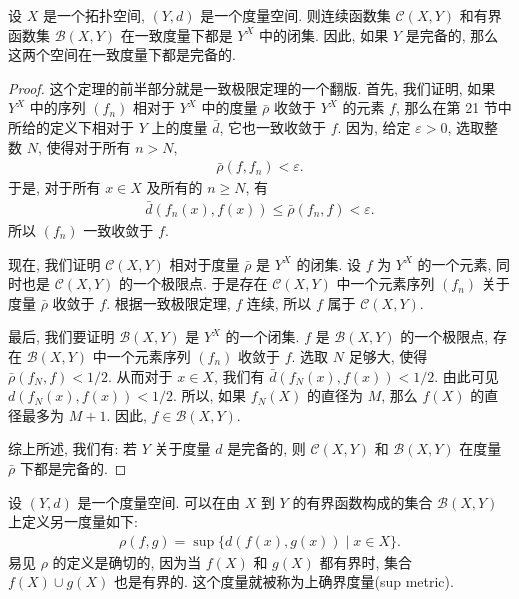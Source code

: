 \documentclass[../../main.tex]{subfiles}
\begin{document}
\begin{theorem}\label{theorem:ch07-C-B-closed}
设 $X$ 是一个拓扑空间, $(Y,d)$ 是一个度量空间. 则连续函数集 $\mathcal{C}(X,Y)$ 和有界函数集 $\mathcal{B}(X,Y)$ 在一致度量下都是 $Y^X$ 中的闭集. 因此, 如果 $Y$ 是完备的, 那么这两个空间在一致度量下都是完备的.
\end{theorem}

\begin{proof}
这个定理的前半部分就是一致极限定理的一个翻版. 首先, 我们证明, 如果 $Y^X$ 中的序列 $(f_n)$ 相对于 $Y^X$ 中的度量 $\bar{\rho}$ 收敛于 $Y^X$ 的元素 $f$, 那么在第 21 节中所给的定义下相对于 $Y$ 上的度量 $\bar{d}$, 它也一致收敛于 $f$. 因为, 给定 $\varepsilon>0$, 选取整数 $N$, 使得对于所有 $n>N$,
\begin{align*}
\bar{\rho}(f,f_n)<\varepsilon.
\end{align*}
于是, 对于所有 $x\in X$ 及所有的 $n\geqslant N$, 有
\begin{align*}
\bar{d}(f_n(x),f(x))\leqslant\bar{\rho}(f_n,f)<\varepsilon.
\end{align*}
所以 $(f_n)$ 一致收敛于 $f$.

现在, 我们证明 $\mathcal{C}(X,Y)$ 相对于度量 $\bar{\rho}$ 是 $Y^X$ 的闭集. 设 $f$ 为 $Y^X$ 的一个元素, 同时也是 $\mathcal{C}(X,Y)$ 的一个极限点. 于是存在 $\mathcal{C}(X,Y)$ 中一个元素序列 $(f_n)$ 关于度量 $\bar{\rho}$ 收敛于 $f$. 根据一致极限定理, $f$ 连续, 所以 $f$ 属于 $\mathcal{C}(X,Y)$.

最后, 我们要证明 $\mathcal{B}(X,Y)$ 是 $Y^X$ 的一个闭集. $f$ 是 $\mathcal{B}(X,Y)$ 的一个极限点, 存在 $\mathcal{B}(X,Y)$ 中一个元素序列 $(f_n)$ 收敛于 $f$. 选取 $N$ 足够大, 使得 $\bar{\rho}(f_N,f)<1/2$. 从而对于 $x\in X$, 我们有 $\bar{d}(f_N(x),f(x))<1/2$. 由此可见 $d(f_N(x),f(x))<1/2$. 所以, 如果 $f_N(X)$ 的直径为 $M$, 那么 $f(X)$ 的直径最多为 $M+1$. 因此, $f\in\mathcal{B}(X,Y)$.

综上所述, 我们有: 若 $Y$ 关于度量 $d$ 是完备的, 则 $\mathcal{C}(X,Y)$ 和 $\mathcal{B}(X,Y)$ 在度量 $\bar{\rho}$ 下都是完备的.
\end{proof}

\begin{definition}\label{definition:ch07-sup-metric}
设 $(Y,d)$ 是一个度量空间. 可以在由 $X$ 到 $Y$ 的有界函数构成的集合 $\mathcal{B}(X,Y)$ 上定义另一度量如下:
\begin{align*}
\rho(f,g)=\sup\{d(f(x),g(x))\mid x\in X\}.
\end{align*}
易见 $\rho$ 的定义是确切的, 因为当 $f(X)$ 和 $g(X)$ 都有界时, 集合 $f(X)\cup g(X)$ 也是有界的. 这个度量就被称为上确界度量(sup metric).
\end{definition}
\end{document}

